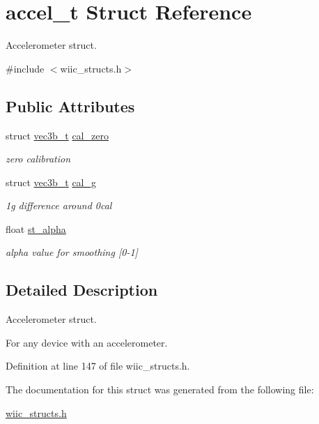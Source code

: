 \hypertarget{structaccel__t}{\section{accel\-\_\-t Struct Reference}
\label{structaccel__t}
}


Accelerometer struct.  




{\ttfamily \#include $<$wiic\-\_\-structs.\-h$>$}

\subsection*{Public Attributes}
\begin{DoxyCompactItemize}
\item 
\hypertarget{structaccel__t_aebbccd4f86055e4265579a425ea0cec7}{struct \hyperlink{structvec3b__t}{vec3b\-\_\-t} \hyperlink{structaccel__t_aebbccd4f86055e4265579a425ea0cec7}{cal\-\_\-zero}}\label{structaccel__t_aebbccd4f86055e4265579a425ea0cec7}

\begin{DoxyCompactList}\small\item\em zero calibration \end{DoxyCompactList}\item 
\hypertarget{structaccel__t_ac1d5d7814dcaf180e02f6180967d4afc}{struct \hyperlink{structvec3b__t}{vec3b\-\_\-t} \hyperlink{structaccel__t_ac1d5d7814dcaf180e02f6180967d4afc}{cal\-\_\-g}}\label{structaccel__t_ac1d5d7814dcaf180e02f6180967d4afc}

\begin{DoxyCompactList}\small\item\em 1g difference around 0cal \end{DoxyCompactList}\item 
\hypertarget{structaccel__t_a6aa36a40f82af45cb67f8db9ff8b41ca}{float \hyperlink{structaccel__t_a6aa36a40f82af45cb67f8db9ff8b41ca}{st\-\_\-alpha}}\label{structaccel__t_a6aa36a40f82af45cb67f8db9ff8b41ca}

\begin{DoxyCompactList}\small\item\em alpha value for smoothing \mbox{[}0-\/1\mbox{]} \end{DoxyCompactList}\end{DoxyCompactItemize}


\subsection{Detailed Description}
Accelerometer struct. 

For any device with an accelerometer. 

Definition at line 147 of file wiic\-\_\-structs.\-h.



The documentation for this struct was generated from the following file\-:\begin{DoxyCompactItemize}
\item 
\hyperlink{wiic__structs_8h}{wiic\-\_\-structs.\-h}\end{DoxyCompactItemize}
